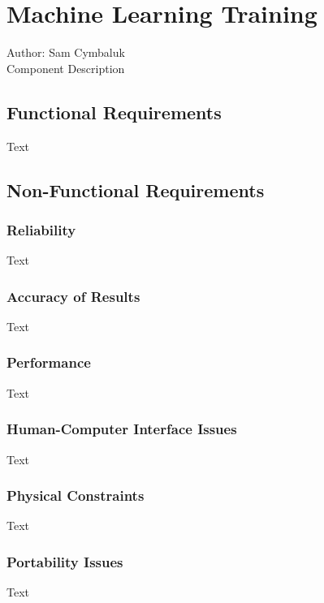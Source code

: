 \documentclass[12pt]{article}
\begin{document}
\section{Machine Learning Training}
Author: Sam Cymbaluk\\

\noindent Component Description

\subsection{Functional Requirements}

Text

\subsection{Non-Functional Requirements}

\subsubsection {Reliability}

Text

\subsubsection {Accuracy of Results}
 
Text

\subsubsection {Performance}

Text

\subsubsection {Human-Computer Interface Issues}

Text

\subsubsection {Physical Constraints}

Text

\subsubsection {Portability Issues}

Text
\end{document}
